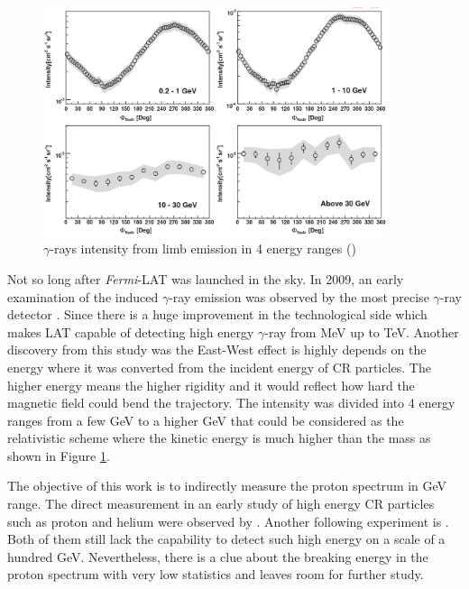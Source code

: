 \begin{figure}[h!]
    \centering
    \includegraphics[width=0.9\textwidth]{content/literature_review/figures/fermi_eastwest.png}
    \caption{
        $\gamma$-rays intensity from limb emission in 4 energy ranges
        (\cite{fermilat_gamma_induced})
    }
    \label{fig:fermi_eastwest}
\end{figure}

Not so long after \textit{Fermi}-LAT was launched in the sky. In 2009,
an early examination of the induced $\gamma$-ray emission was 
observed by the most precise $\gamma$-ray detector
\cite{fermilat_gamma_induced}. Since there 
is a huge improvement in the technological side which makes LAT 
capable of detecting high energy $\gamma$-ray from MeV up to TeV.
Another discovery from this study was the East-West effect is highly 
depends on the energy where it was converted from the incident energy of CR particles. The higher energy means the higher rigidity
and it would reflect how hard the magnetic field could bend the trajectory.
The intensity was divided into 4 energy ranges from a few GeV 
to a higher GeV that could be considered as the relativistic scheme 
where the kinetic energy is much higher than the mass as shown 
in Figure \ref{fig:fermi_eastwest}.

The objective of this work is to indirectly measure the proton spectrum in 
GeV range. The direct measurement in an early study of high energy 
CR particles such as proton and helium were observed by \cite{bess_experiment}.
Another following experiment is \cite{adriani2011pamela}. Both of 
them still lack the capability to detect such high energy on a scale of 
a hundred GeV. Nevertheless, there is a clue about the breaking energy 
in the proton spectrum with very low statistics and leaves room for further study.


